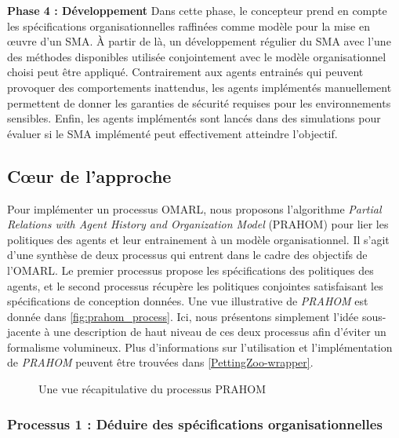 \documentclass[contribution]{jfsma}
\begin{document}
\textbf{Phase 4 : Développement} \quad Dans cette phase, le concepteur prend en compte les spécifications organisationnelles raffinées comme modèle pour la mise en œuvre d'un SMA. À partir de là, un développement régulier du SMA avec l'une des méthodes disponibles utilisée conjointement avec le modèle organisationnel choisi peut être appliqué. Contrairement aux agents entrainés qui peuvent provoquer des comportements inattendus, les agents implémentés manuellement permettent de donner les garanties de sécurité requises pour les environnements sensibles. Enfin, les agents implémentés sont lancés dans des simulations pour évaluer si le SMA implémenté peut effectivement atteindre l'objectif.

\subsection{Cœur de l'approche}

Pour implémenter un processus OMARL, nous proposons l'algorithme \emph{Partial Relations with Agent History and Organization Model} (PRAHOM) pour lier les politiques des agents et leur entrainement à un modèle organisationnel.
Il s'agit d'une synthèse de deux processus qui entrent dans le cadre des objectifs de l'OMARL. Le premier processus propose les spécifications des politiques des agents, et le second processus récupère les politiques conjointes satisfaisant les spécifications de conception données. Une vue illustrative de \emph{PRAHOM} est donnée dans \autoref{fig:prahom_process}.
Ici, nous présentons simplement l'idée sous-jacente à une description de haut niveau de ces deux processus afin d'éviter un formalisme volumineux. Plus d'informations sur l'utilisation et l'implémentation de \emph{PRAHOM} peuvent être trouvées dans \autoref{PettingZoo-wrapper}.

\begin{figure}[h!]
  \centering
  
  \caption{Une vue récapitulative du processus PRAHOM}
  \label{fig:prahom_process}
\end{figure}

\subsubsection{Processus 1 : Déduire des spécifications organisationnelles}
\end{document}
